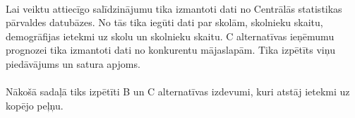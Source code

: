 \paragraph{}
Lai veiktu attiecīgo salīdzinājumu tika izmantoti dati no Centrālās statistikas pārvaldes datubāzes. No tās tika iegūti dati par skolām,
skolnieku skaitu, demogrāfijas ietekmi uz skolu un skolnieku skaitu. C alternatīvas ieņēmumu prognozei tika izmantoti dati no konkurentu
mājaslapām. Tika izpētīts viņu piedāvājums un satura apjoms.  
\paragraph{}
Nākošā sadaļā tiks izpētīti B un C alternatīvas izdevumi, kuri atstāj ietekmi uz kopējo peļņu.
